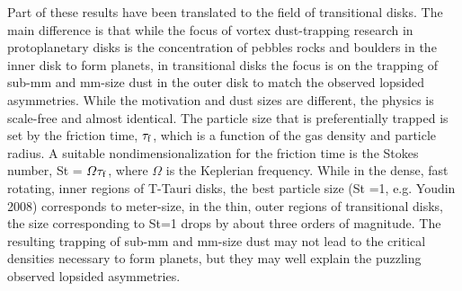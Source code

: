 \documentclass[apj]{emulateapj}
\begin{document}
Part of these results have been translated to the field of
transitional disks. The main difference is that while the focus 
of vortex dust-trapping research in protoplanetary disks is the
concentration of pebbles rocks and boulders in the inner disk to form
planets, in transitional disks the focus is on the trapping of sub-mm
and mm-size dust in the outer disk to match the observed lopsided 
asymmetries. While the motivation and dust sizes are different, the
physics is scale-free and almost identical. The particle size that is
preferentially trapped is set by the friction time, $\tau_{\rm f}$, which is a
function of the gas density and particle radius. A suitable nondimensionalization for the
friction time is the Stokes number, St = $\varOmega \tau_{\rm f}$,
where $\varOmega$ is the Keplerian frequency. While in the dense, fast
rotating, inner regions of T-Tauri disks, the best particle size (St =1, e.g. Youdin 2008)
corresponds to meter-size, in the thin, outer regions of transitional
disks, the size corresponding to St=1 drops by about three orders of
magnitude. The resulting trapping of sub-mm and mm-size dust may not
lead to the critical densities necessary to form planets, but they may
well explain the puzzling observed lopsided asymmetries. 















\end{document}
